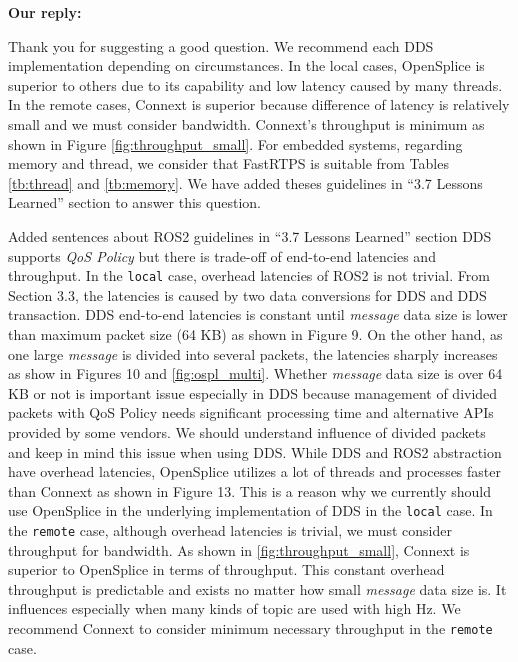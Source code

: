 \documentclass{article}
\begin{document}
\begin{enumerate}
  \begin{flushleft}
    \textbf{Our reply:}
  \end{flushleft}
  Thank you for suggesting a good question.
  We recommend each DDS implementation depending on circumstances.
  In the local cases, OpenSplice is superior to others due to its capability and low latency caused by many threads.
  In the remote cases, Connext is superior because difference of latency is relatively small and we must consider bandwidth.
  Connext's throughput is minimum as shown in Figure \ref{fig:throughput_small}.
  For embedded systems, regarding memory and thread, we consider that FastRTPS is suitable from Tables \ref{tb:thread} and \ref{tb:memory}.
  We have added theses guidelines in ``3.7 Lessons Learned'' section to answer this question.
  \begin{itembox}[|]{Added sentences about ROS2 guidelines in ``3.7 Lessons Learned'' section}
    DDS supports \emph{QoS Policy} but there is trade-off of end-to-end latencies and throughput.
    In the \texttt{local} case, overhead latencies of ROS2 is not trivial.
    From Section 3.3, the latencies is caused by two data conversions for DDS and DDS transaction.
    DDS end-to-end latencies is constant until \emph{message} data size is lower than maximum packet size (64 KB) as shown in Figure 9.
    On the other hand, as one large \emph{message} is divided into several packets, the latencies sharply increases as show in Figures 10 and \ref{fig:ospl_multi}.
    Whether \emph{message} data size is over 64 KB or not is important issue especially in DDS because management of divided packets with QoS Policy needs significant processing time and alternative APIs provided by some vendors.
    We should understand influence of divided packets and keep in mind this issue when using DDS.
    While DDS and ROS2 abstraction have overhead latencies, OpenSplice utilizes a lot of threads and processes faster than Connext as shown in Figure 13.
    This is a reason why we currently should use OpenSplice in the underlying implementation of DDS in the \texttt{local} case.
    In the \texttt{remote} case, although overhead latencies is trivial, we must consider throughput for bandwidth.
    As shown in \ref{fig:throughput_small}, Connext is superior to OpenSplice in terms of throughput.
    This constant overhead throughput is predictable and exists no matter how small \emph{message} data size is.
    It influences especially when many kinds of topic are used with high Hz.
    We recommend Connext to consider minimum necessary throughput in the \texttt{remote} case.
    

\end{itembox}
\end{enumerate}
\end{document}
